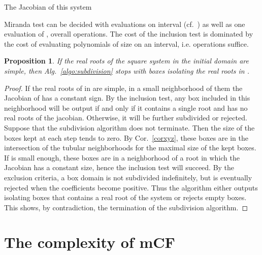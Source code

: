 \documentclass{sig-alternate}
\newtheorem{proposition}[theorem]{Proposition}
\begin{document}
The Jacobian of this system


\fi
{}  Miranda test can be
decided with  evaluations on interval (cf.~\cite{Garloff00}) as well
as one evaluation of , overall  operations.  The
cost of the inclusion test is dominated by the cost of evaluating
 polynomials of size  on an interval,
i.e.  operations suffice.


\begin{proposition} 
If the real roots of the square system in the initial domain  are simple, then
Alg.~\ref{algo:subdivision} stops with boxes isolating the
real roots in .
\end{proposition}
\begin{proof}
  If the real roots of  in  are simple, in a small neighborhood of
  them the Jacobian of  has a constant sign. By the inclusion
  test, any box included in this neighborhood will be output if and
  only if it contains a single root and has no real roots of the
  jacobian. Otherwise, it will be further subdivided or
  rejected. Suppose that the subdivision algorithm does not
  terminate. Then the size of the boxes kept at each step tends to
  zero. By Cor.~\ref{corxyz}, these boxes are in the intersection of
  the tubular neighborhoods  for
   the maximal size of the kept boxes. If 
  is small enough, these boxes are in a neighborhood of a root in
  which the Jacobian has a constant size, hence the inclusion test
  will succeed.  By the exclusion criteria, a box domain is not
  subdivided indefinitely, but is eventually rejected when the
  coefficients become positive.  Thus the algorithm either outputs
  isolating boxes that contains a real root of the system or rejects
  empty boxes. This shows, by contradiction, the termination of the
  subdivision algorithm.
\end{proof} 



\section{The complexity of  mCF} 
\label{sec:complexity}
\end{document}
